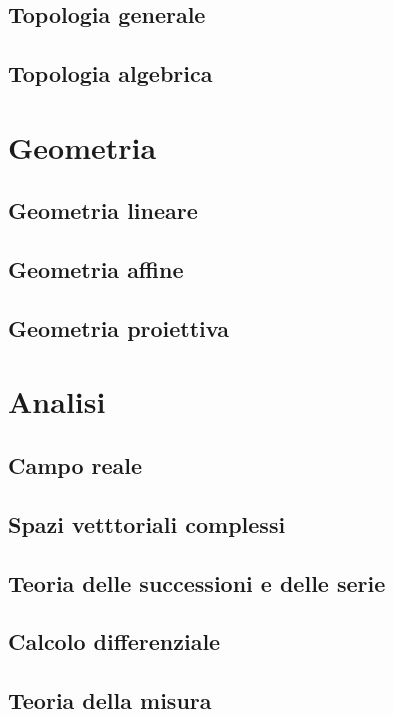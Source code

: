 \documentclass{book}
\begin{document}
	\chapter{Topologia generale}
	
	\chapter{Topologia algebrica}
	
	\part{Geometria}
	\chapter{Geometria lineare}
	
	\chapter{Geometria affine}
	
	\chapter{Geometria proiettiva}
	
	\part{Analisi}
	\chapter{Campo reale}
	
	\chapter{Spazi vetttoriali complessi}
	
	\chapter{Teoria delle successioni e delle serie}
	
	\chapter{Calcolo differenziale}
	
	\chapter{Teoria della misura}
	
\end{document}
